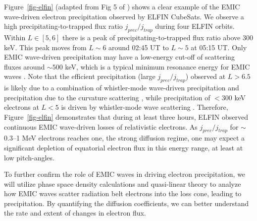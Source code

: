 \documentclass[
  letterpaper,
  DIV=11,
  numbers=noendperiod]{scrartcl}
\begin{document}
Figure~\ref{fig-elfin} (adapted from Fig 5 of \citet{angelopoulosEnergeticElectronPrecipitation2023}) shows a clear example of the EMIC wave-driven electron precipitation observed by ELFIN CubeSats. We observe a high precipitating-to-trapped flux ratio \(j_{prec}/j_{trap}\) during four ELFIN orbits.
Within \(L \in [5,6]\) there is a peak of precipitating-to-trapped flux ratio above \(300\) keV. This peak moves from \(L \sim 6\) around 02:45 UT to \(L \sim 5\) at 05:15 UT. Only EMIC wave-driven precipitation may have a low-energy cut-off of scattering fluxes around \(\sim 500\) keV, which is a typical minimum resonance energy for EMIC waves \citep[see the identification of other EMIC wave-driven precipitation events with similar precipitating-to-trapped ratios in][]{anNonresonantScatteringRelativistic2022, angelopoulosEnergeticElectronPrecipitation2023}. Note that the efficient precipitation (large \(j_{prec}/j_{trap}\)) observed at \(L>6.5\) is likely due to a combination of whistler-mode wave-driven precipitation \citep{shiRoleULFWaves2022} and precipitation due to the curvature scattering \citep{wilkinsStatisticalCharacteristicsElectron2023}, while precipitation of \(<300\) keV electrons at \(L<5\) is driven by whistler-mode wave scattering \citep[see similar examples of quasi-periodical precipitation on the dusk flank in][]{artemyevRoleDuctingRelativistic2021}.
Therefore, Figure~\ref{fig-elfin} demonstrates that during at least three hours, ELFIN observed continuous EMIC wave-driven losses of relativistic electrons. As \(j_{prec}/j_{trap}\) for \(\sim\) 0.3--1 MeV electrons reaches one, the strong diffusion regime, one may expect a significant depletion of equatorial electron flux in this energy range, at least at low pitch-angles.

To further confirm the role of EMIC waves in driving electron precipitation, we will utilize phase space density calculations and quasi-linear theory to analyze how EMIC waves scatter radiation belt electrons into the loss cone, leading to precipitation. By quantifying the diffusion coefficients, we can better understand the rate and extent of changes in electron flux.
\end{document}
